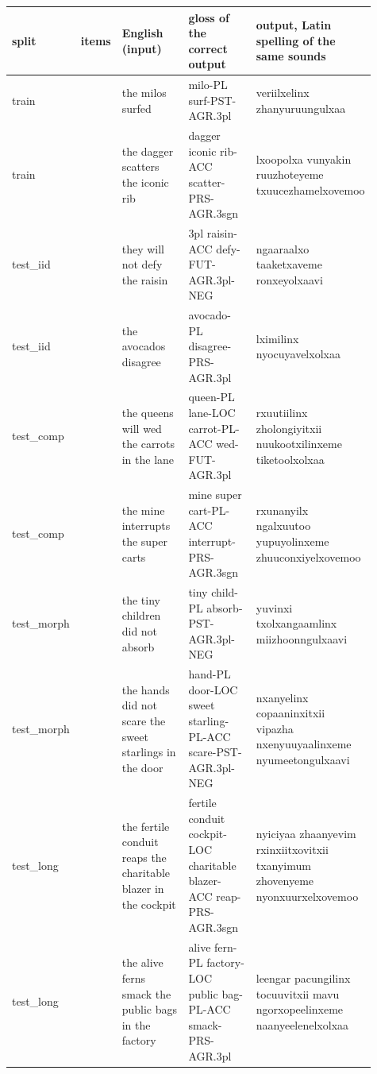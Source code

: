 \documentclass[10pt,a4paper,oneside]{article}
\begin{document}
{\scriptsize
\begin{longtable}{>{\raggedright\arraybackslash}p{0.088\linewidth}>{\raggedright\arraybackslash}p{0.058\linewidth}>{\raggedright\arraybackslash}p{0.268\linewidth}>{\raggedright\arraybackslash}p{0.268\linewidth}>{\raggedright\arraybackslash}p{0.228\linewidth}}
\toprule
\textbf{split} & \textbf{items} & \textbf{English (input)} & \textbf{gloss of the correct output} & \textbf{output, Latin spelling of the same sounds} \\
\midrule
\endhead
train & 50000 & the milos surfed & milo-PL surf-PST-AGR.3pl & veriilxelinx zhanyuruungulxaa \\
train & 50000 & the dagger scatters the iconic rib & dagger iconic rib-ACC scatter-PRS-AGR.3sgn & lxoopolxa vunyakin ruuzhoteyeme txuucezhamelxovemoo \\
test\_iid & 500 & they will not defy the raisin & 3pl raisin-ACC defy-FUT-AGR.3pl-NEG & ngaaraalxo taaketxaveme ronxeyolxaavi \\
test\_iid & 500 & the avocados disagree & avocado-PL disagree-PRS-AGR.3pl & lximilinx nyocuyavelxolxaa \\
test\_comp & 500 & the queens will wed the carrots in the lane & queen-PL lane-LOC carrot-PL-ACC wed-FUT-AGR.3pl & rxuutiilinx zholongiyitxii nuukootxilinxeme tiketoolxolxaa \\
test\_comp & 500 & the mine interrupts the super carts & mine super cart-PL-ACC interrupt-PRS-AGR.3sgn & rxunanyilx ngalxuutoo yupuyolinxeme zhuuconxiyelxovemoo \\
test\_morph & 500 & the tiny children did not absorb & tiny child-PL absorb-PST-AGR.3pl-NEG & yuvinxi txolxangaamlinx miizhoonngulxaavi \\
test\_morph & 500 & the hands did not scare the sweet starlings in the door & hand-PL door-LOC sweet starling-PL-ACC scare-PST-AGR.3pl-NEG & nxanyelinx copaaninxitxii vipazha nxenyuuyaalinxeme nyumeetongulxaavi \\
test\_long & 500 & the fertile conduit reaps the charitable blazer in the cockpit & fertile conduit cockpit-LOC charitable blazer-ACC reap-PRS-AGR.3sgn & nyiciyaa zhaanyevim rxinxiitxovitxii txanyimum zhovenyeme nyonxuurxelxovemoo \\
test\_long & 500 & the alive ferns smack the public bags in the factory & alive fern-PL factory-LOC public bag-PL-ACC smack-PRS-AGR.3pl & leengar pacungilinx tocuuvitxii mavu ngorxopeelinxeme naanyeelenelxolxaa \\
\bottomrule
\end{longtable}}
\end{document}

